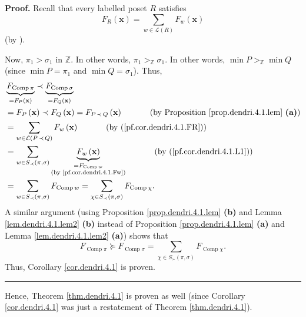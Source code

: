 \documentclass[numbers=enddot,12pt,final,onecolumn,notitlepage]{scrartcl}%
\theoremstyle{definition}
\newenvironment{proof}[1][Proof]{\noindent\textbf{#1.} }{\ \rule{0.5em}{0.5em}}
\newenvironment{verlong}{}{}
\newcommand{\ZZ}{\mathbb{Z}}
\let\sumnonlimits\sum
\renewcommand{\sum}{\sumnonlimits\limits}
\begin{document}
\begin{verlong}
\begin{proof}
Recall that every labelled poset $R$ satisfies%
\begin{equation}
F_{R}\left(  \mathbf{x}\right)  =\sum_{w\in\mathcal{L}\left(  R\right)  }%
F_{w}\left(  \mathbf{x}\right)  \label{pf.cor.dendri.4.1.FR}%
\end{equation}
(by \cite[Theorem 5.2.11]{HopfComb}).

Now, $\pi_{1}>\sigma_{1}$ in $\mathbb{Z}$. In other words, $\pi_{1}%
>_{\ZZ}\sigma_{1}$. In other words, $\min P>_{\ZZ}\min Q$ (since
$\min P=\pi_{1}$ and $\min Q=\sigma_{1}$). Thus,
\begin{align*}
& \underbrace{F_{\operatorname*{Comp}\pi}}_{=F_{P}\left(  \mathbf{x}\right)
}\left.  \prec\right.  \underbrace{F_{\operatorname*{Comp}\sigma}}%
_{=F_{Q}\left(  \mathbf{x}\right)  }\\
& =F_{P}\left(  \mathbf{x}\right)  \left.  \prec\right.  F_{Q}\left(
\mathbf{x}\right)  =F_{P\left.  \prec\right.  Q}\left(  \mathbf{x}\right)
\ \ \ \ \ \ \ \ \ \ \left(  \text{by Proposition \ref{prop.dendri.4.1.lem}
\textbf{(a)}}\right)  \\
& =\sum_{w\in\mathcal{L}\left(  P\left.  \prec\right.  Q\right)  }F_{w}\left(
\mathbf{x}\right)  \ \ \ \ \ \ \ \ \ \ \left(  \text{by
(\ref{pf.cor.dendri.4.1.FR})}\right)  \\
& =\sum_{w\in S_{\prec}\left(  \pi,\sigma\right)  }\underbrace{F_{w}\left(
\mathbf{x}\right)  }_{\substack{=F_{\operatorname*{Comp}w}\\\text{(by
\eqref{pf.cor.dendri.4.1.Fw})}}}\ \ \ \ \ \ \ \ \ \ \left(  \text{by
(\ref{pf.cor.dendri.4.1.L1})}\right)  \\
& =\sum_{w\in S_{\prec}\left(  \pi,\sigma\right)  }F_{\operatorname*{Comp}%
w}=\sum_{\chi\in S_{\prec}\left(  \pi,\sigma\right)  }F_{\operatorname*{Comp}%
\chi}.
\end{align*}
A similar argument (using Proposition \ref{prop.dendri.4.1.lem} \textbf{(b)}
and Lemma \ref{lem.dendri.4.1.lem2} \textbf{(b)} instead of Proposition
\ref{prop.dendri.4.1.lem} \textbf{(a)} and Lemma \ref{lem.dendri.4.1.lem2}
\textbf{(a)}) shows that%
\[
F_{\operatorname*{Comp}\pi}\left.  \succeq\right.  F_{\operatorname*{Comp}%
\sigma}=\sum_{\chi\in S_{\succ}\left(  \pi,\sigma\right)  }%
F_{\operatorname*{Comp}\chi}.
\]
Thus, Corollary \ref{cor.dendri.4.1} is proven.
\end{proof}

Hence, Theorem \ref{thm.dendri.4.1} is proven as well (since Corollary
\ref{cor.dendri.4.1} was just a restatement of Theorem \ref{thm.dendri.4.1}).


\end{verlong}
\end{document}
